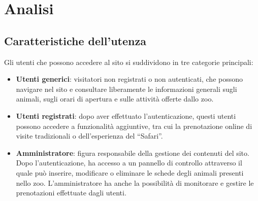 \section{Analisi}

\subsection{Caratteristiche dell'utenza}
Gli utenti che possono accedere al sito si suddividono in tre categorie principali:
\begin{itemize}
    \item \textbf{Utenti generici}: visitatori non registrati o non autenticati, che possono navigare nel sito e consultare liberamente le informazioni generali sugli animali, sugli orari di apertura e sulle attività offerte dallo zoo.
    
    \item \textbf{Utenti registrati}: dopo aver effettuato l'autenticazione, questi utenti possono accedere a funzionalità aggiuntive, tra cui la prenotazione online di visite tradizionali o dell’esperienza del ``Safari''.
    
    \item \textbf{Amministratore}: figura responsabile della gestione dei contenuti del sito. Dopo l’autenticazione, ha accesso a un pannello di controllo attraverso il quale può inserire, modificare o eliminare le schede degli animali presenti nello zoo. L’amministratore ha anche la possibilità di monitorare e gestire le prenotazioni effettuate dagli utenti.
\end{itemize}

